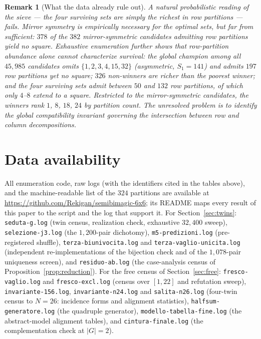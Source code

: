 \documentclass[11pt]{article}
\newtheorem{remark}[theorem]{Remark}
\begin{document}
\begin{remark}[What the data already rule out]\label{rem:richness}
A natural probabilistic reading of the sieve --- \emph{the four
surviving sets are simply the richest in row partitions} --- fails.
Mirror symmetry is empirically necessary for the optimal sets, but far
from sufficient: $378$ of the $382$ mirror-symmetric candidates
admitting row partitions yield no square. Exhaustive enumeration
further shows that row-partition abundance alone cannot characterize
survival: the global champion among all $45{,}985$ candidates omits
$\{1,2,3,4,15,32\}$ (asymmetric, $S_1=141$) and admits $197$ row
partitions yet no square; $326$ non-winners are richer than the
poorest winner; and the four surviving sets admit between $50$ and
$132$ row partitions, of which only $4$--$8$ extend to a square.
Restricted to the mirror-symmetric candidates, the winners rank $1$,
$8$, $18$, $24$ by partition count. The unresolved problem is to
identify the global compatibility invariant governing the intersection
between row and column decompositions.
\end{remark}

\section*{Data availability}

All enumeration code, raw logs (with the identifiers cited in the tables
above), and the machine-readable list of the $324$ partitions are
available at
\url{https://github.com/Rekigan/semibimagic-6x6}; its README
maps every result of this paper to the script and the log that support
it. For Section~\ref{sec:twins}: \texttt{seduta-g.log}
(twin census, realization check, exhaustive $32{,}400$ sweep),
\texttt{selezione-j3.log} (the $1{,}200$-pair dichotomy),
\texttt{m5-predizioni.log} (pre-registered shuffle),
\texttt{terza-biunivocita.log} and \texttt{terza-vaglio-unicita.log}
(independent re-implementations of the bijection check and of the
$1{,}078$-pair uniqueness screen), and \texttt{residuo-ab.log} (the
case-analysis census of Proposition~\ref{prop:reduction}). For the
free census of Section~\ref{sec:free}: \texttt{fresco-vaglio.log} and
\texttt{fresco-excl.log} (census over $[1,22]$ and refutation sweep),
\texttt{invariante-156.log}, \texttt{invariante-n24.log} and
\texttt{salita-n26.log} (four-twin census to $N=26$: incidence forms
and alignment statistics), \texttt{halfsum-generatore.log} (the
quadruple generator), \texttt{modello-tabella-fine.log} (the
abstract-model alignment tables), and \texttt{cintura-finale.log}
(the complementation check at $|G|=2$).
\end{document}

